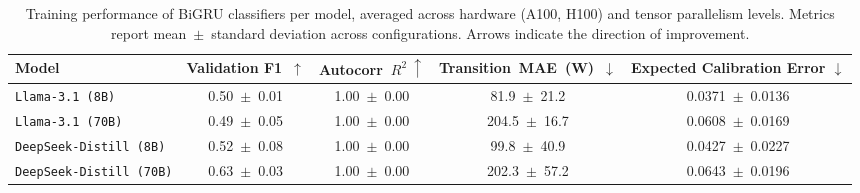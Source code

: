 \begin{table*}[!htb]
\centering
\small
\caption{Training performance of BiGRU classifiers per model, averaged across hardware (A100, H100) and tensor parallelism levels. 
Metrics report mean~$\pm$~standard deviation across configurations. 
Arrows indicate the direction of improvement.}
\label{tab:train_eval_model}
\vspace{0.4em}
\begin{tabular}{lcccc}
\toprule
\textbf{Model} & \textbf{Validation F1~$\uparrow$} & \textbf{Autocorr~$R^2~\uparrow$} & \textbf{Transition~MAE~(W)~$\downarrow$} & \textbf{Expected Calibration Error} $\downarrow$ \\
\midrule
\texttt{Llama-3.1 (8B)} & 0.50~$\pm$~0.01 & 1.00~$\pm$~0.00 & 81.9~$\pm$~21.2 & 0.0371~$\pm$~0.0136 \\
\texttt{Llama-3.1 (70B)} & 0.49~$\pm$~0.05 & 1.00~$\pm$~0.00 & 204.5~$\pm$~16.7 & 0.0608~$\pm$~0.0169 \\
\texttt{DeepSeek-Distill (8B)} & 0.52~$\pm$~0.08 & 1.00~$\pm$~0.00 & 99.8~$\pm$~40.9 & 0.0427~$\pm$~0.0227 \\
\texttt{DeepSeek-Distill (70B)} & 0.63~$\pm$~0.03 & 1.00~$\pm$~0.00 & 202.3~$\pm$~57.2 & 0.0643~$\pm$~0.0196 \\
\bottomrule
\end{tabular}
\end{table*}